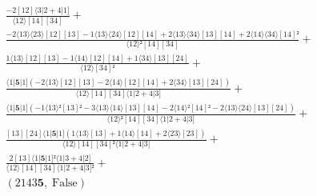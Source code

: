 \documentclass[varwidth, border=5pt]{standalone}
\begin{document}
\begin{my}
$\begin{gathered}
\scriptscriptstyle\frac{-2[12]⟨3|2+4|1]}{⟨12⟩[14][34]} +\\
\scriptscriptstyle\frac{-2⟨13⟩⟨23⟩[12][13]-1⟨13⟩⟨24⟩[12][14]+2⟨13⟩⟨34⟩[13][14]+2⟨14⟩⟨34⟩[14]²}{⟨12⟩²[14][34]} +\\
\scriptscriptstyle\frac{1⟨13⟩[12][13]-1⟨14⟩[12][14]+1⟨34⟩[13][24]}{⟨12⟩[34]²} +\\
\scriptscriptstyle\frac{⟨1|𝟓|1](-2⟨13⟩[12][13]-2⟨14⟩[12][14]+2⟨34⟩[13][24])}{⟨12⟩[14][34]⟨1|2+4|3]} +\\
\scriptscriptstyle\frac{⟨1|𝟓|1](-1⟨13⟩²[13]²-3⟨13⟩⟨14⟩[13][14]-2⟨14⟩²[14]²-2⟨13⟩⟨24⟩[13][24])}{⟨12⟩²[14][34]⟨1|2+4|3]} +\\
\scriptscriptstyle\frac{[13][24]⟨1|𝟓|1](1⟨13⟩[13]+1⟨14⟩[14]+2⟨23⟩[23])}{⟨12⟩[14][34]²⟨1|2+4|3]} +\\
\scriptscriptstyle\frac{2[13]⟨1|𝟓|1]²⟨1|3+4|2]}{⟨12⟩[14][34]⟨1|2+4|3]²} +\\
\scriptscriptstyle(2143𝟓,\;\text{False}) \phantom{+}
\end{gathered}$
\end{my}
\end{document}
